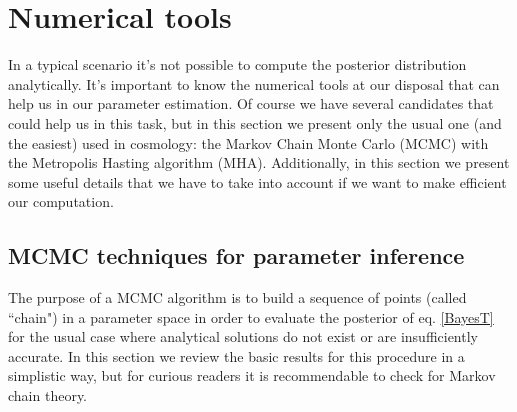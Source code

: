 \documentclass[onecolumn,           %
               showpacs,            %
               preprintnumbers,     %
               aps,                 %
               letterpaper,             %
               superscriptaddress,      %
               nofootinbib,         %
               tightenlines,        %
               floats,floatfix      %
               ,usenatbib,
               ]{revtex4-1}
\begin{document}

%

\section{Numerical tools}

In a typical scenario it's not possible to compute the posterior distribution analytically. It's important to know the numerical tools at our disposal that can help us in our parameter estimation. Of course we have several candidates that could help us in this task, but in this section we present only the usual one (and the easiest) used in cosmology: the Markov Chain Monte Carlo (MCMC) with the Metropolis Hasting algorithm (MHA). Additionally, in this section we present some useful details that we have to take into account if we want to make efficient our computation. 

\subsection{MCMC techniques for parameter inference}

The purpose of a MCMC algorithm is to build a sequence of points (called ``chain") in a parameter space in order to evaluate the posterior of eq. \eqref{BayesT} for the usual case where analytical solutions do not exist or are insufficiently accurate. In this section we review the basic results for this procedure in a simplistic way, but for curious readers it is recommendable to check \cite{mcmc1, mcmc2, mcmc3, mcmc4} for Markov chain theory.
\end{document}
